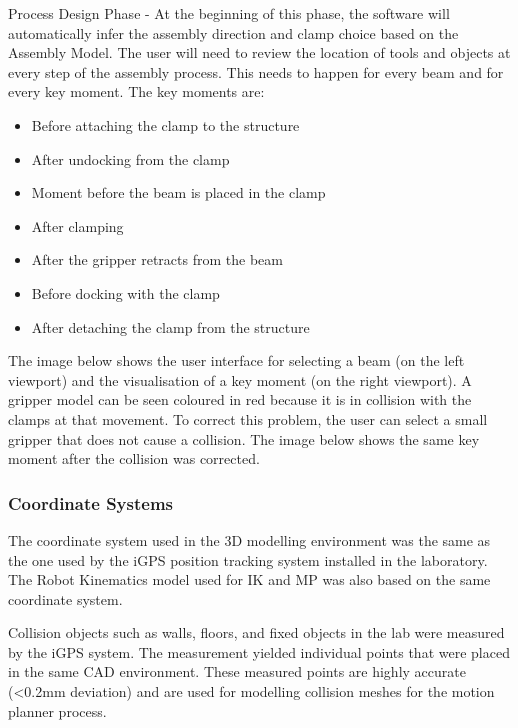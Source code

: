 Process Design Phase - At the beginning of this phase, the software will automatically infer the assembly direction and clamp choice based on the Assembly Model. 
The user will need to review the location of tools and objects at every step of the assembly process. This needs to happen for every beam and for every key moment. The key moments are:
\begin{itemize}
    \item Before attaching the clamp to the structure
    \item After undocking from the clamp
    \item Moment before the beam is placed in the clamp
    \item After clamping
    \item After the gripper retracts from the beam
    \item Before docking with the clamp
    \item After detaching the clamp from the structure
\end{itemize}

The image below shows the user interface for selecting a beam (on the left viewport) and the visualisation of a key moment (on the right viewport). A gripper model can be seen coloured in red because it is in collision with the clamps at that movement. 
To correct this problem, the user can select a small gripper that does not cause a collision. The image below shows the same key moment after the collision was corrected.

\subsubsection{Coordinate Systems}

The coordinate system used in the 3D modelling environment was the same as the one used by the iGPS position tracking system \parencite{stadelmannEndEffectorPoseCorrection2019} installed in the laboratory. The Robot Kinematics model used for IK and MP was also based on the same coordinate system. 

Collision objects such as walls, floors, and fixed objects in the lab were measured by the iGPS system. The measurement yielded individual points that were placed in the same CAD environment. These measured points are highly accurate (<0.2mm deviation) and are used for modelling collision meshes for the motion planner process.

